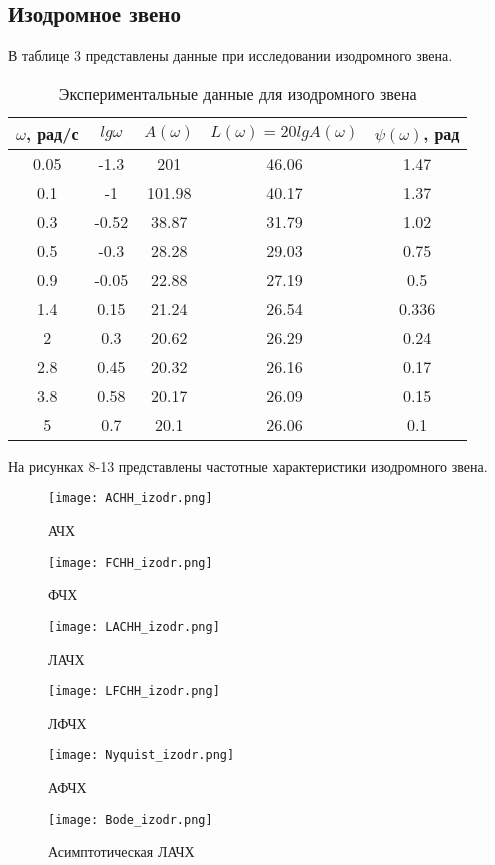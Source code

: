 \documentclass[12pt,a4paper]{article}
\begin{document}
\newpage
\begin{center}
\section{Изодромное звено}
\end{center}

В таблице 3 представлены данные при исследовании изодромного звена.
\begin{table}[h!]
	\renewcommand{\arraystretch}{1.8} %
	\centering
	\begin{threeparttable}
	\caption{Экспериментальные данные для изодромного звена}
	\begin{tabular}{|c|c|c|c|c|}
		\hline $\omega$, рад/с & $lg\omega$ & $A(\omega)$ & $L(\omega)=20lgA(\omega)$ & $\psi(\omega)$, рад\\
		\hline 0.05 & -1.3 & 201 & 46.06 & 1.47\\
		\hline 0.1 & -1 & 101.98 & 40.17 & 1.37\\
		\hline 0.3 & -0.52 & 38.87 & 31.79 & 1.02\\
		\hline 0.5 & -0.3 & 28.28 & 29.03 & 0.75\\
		\hline 0.9 & -0.05 & 22.88 & 27.19 & 0.5\\
		\hline 1.4 & 0.15 & 21.24 & 26.54 & 0.336\\
		\hline 2 & 0.3 & 20.62 & 26.29 & 0.24\\
		\hline 2.8 & 0.45 & 20.32 & 26.16 & 0.17\\
		\hline 3.8 & 0.58 & 20.17 & 26.09 & 0.15\\
		\hline 5 & 0.7 & 20.1 & 26.06 & 0.1\\
		\hline
	\end{tabular}
	\end{threeparttable}
\end{table}

На рисунках 8-13 представлены частотные характеристики изодромного звена.
\begin{figure}[H]
	\centering
	\texttt{[image: ACHH\_izodr.png]}
	\caption{АЧХ}
\end{figure}
\begin{figure}[H]
	\centering
	\texttt{[image: FCHH\_izodr.png]}
	\caption{ФЧХ}
\end{figure}
\begin{figure}[H]
	\centering
	\texttt{[image: LACHH\_izodr.png]}
	\caption{ЛАЧХ}
\end{figure}
\begin{figure}[H]
	\centering
	\texttt{[image: LFCHH\_izodr.png]}
	\caption{ЛФЧХ}
\end{figure}
\begin{figure}[H]
	\centering
	\texttt{[image: Nyquist\_izodr.png]}
	\caption{АФЧХ}
\end{figure}
\begin{figure}[H]
	\centering
	\texttt{[image: Bode\_izodr.png]}
	\caption{Асимптотическая ЛАЧХ}
\end{figure}
\end{document}
